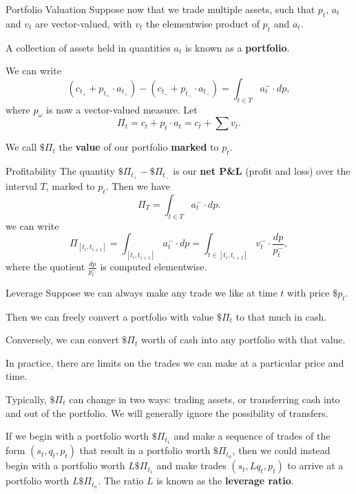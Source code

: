 \documentclass{beamer}
\begin{document}
\begin{frame}{Portfolio Valuation}
	Suppose now that we trade multiple assets, such that $p_t$, $a_t$ and $v_t$ are vector-valued, with $v_t$ the elementwise product of $p_t$ and $a_t$.

	A collection of assets held in quantities $a_t$ is known as a \textbf{portfolio}.

	\pause

	We can write
	$$(c_{t_+} + p_{t_+} \cdot a_{t_+}) - (c_{t_-} + p_{t_-} \cdot a_{t_-}) = \int_{t\in T} a_t^- \cdot dp,$$
	where $p_\omega$ is now a vector-valued measure. \pause Let
	$$\Pi_t	= c_t + p_t\cdot a_t = c_t + \sum v_t.$$

	We call $\$\Pi_t$ the \textbf{value} of our portfolio \textbf{marked} to $p_t$.
\end{frame}

\begin{frame}{Profitability}
	The quantity $\$\Pi_{t_+} - \$\Pi_{t_-}$ is our \textbf{net P\&L} (profit and loss) over the interval $T$, marked to $p_t$.
	Then we have
	$$\Pi_T	= \int_{t\in T} a_t^- \cdot dp.$$
	we can write
	$$\Pi_{[t_i,t_{i+1}]} = \int_{[t_i,t_{i+1}]} a_t^- \cdot dp = \int_{t\in [t_i, t_{i+1}]} v_t^- \cdot \frac{dp}{p_t^-},$$
	where the quotient $\frac{dp}{p_t^-}$ is computed elementwise.
\end{frame}

\begin{frame}{Leverage}
	Suppose we can always make any trade we like at time $t$ with price $\$p_t$. %

	Then we can freely convert a portfolio with value $\$\Pi_t$ to that much in cash.

	Conversely, we can convert $\$\Pi_t$ worth of cash into any portfolio with that value.

	In practice, there are limits on the trades we can make at a particular price and time.

	\pause

	Typically, $\$\Pi_t$ can change in two ways: trading assets, or transferring cash into and out of the portfolio. We will generally ignore the possibility of transfers.

	\pause

	If we begin with a portfolio worth $\$\Pi_{t_1}$ and make a sequence of trades of the form $(s_t,q_t,p_t)$ that result in a portfolio worth $\$\Pi_{t_n}$, then we could instead begin with a portfolio worth $L \$\Pi_{t_1}$ and make trades $(s_t, L q_t, p_t)$ to arrive at a portfolio worth $L \$\Pi_{t_n}$. The ratio $L$ is known as the \textbf{leverage ratio}.
\end{frame}
\end{document}
